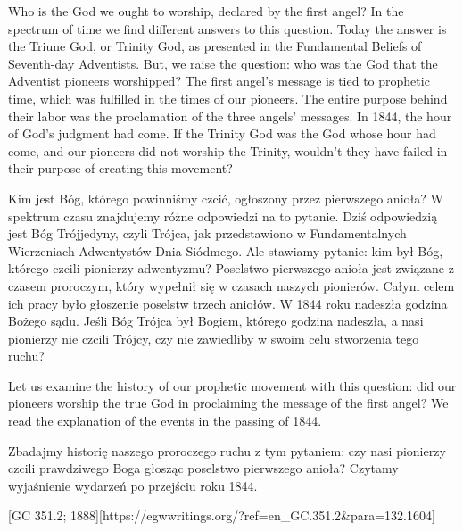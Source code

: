 Who is the God we ought to worship, declared by the first angel? In the spectrum of time we find different answers to this question. Today the answer is the Triune God, or Trinity God, as presented in the Fundamental Beliefs of Seventh-day Adventists. But, we raise the question: who was the God that the Adventist pioneers worshipped? The first angel’s message is tied to prophetic time, which was fulfilled in the times of our pioneers. The entire purpose behind their labor was the proclamation of the three angels’ messages. In 1844, the hour of God’s judgment had come. If the Trinity God was the God whose hour had come, and our pioneers did not worship the Trinity, wouldn't they have failed in their purpose of creating this movement?


Kim jest Bóg, którego powinniśmy czcić, ogłoszony przez pierwszego anioła? W spektrum czasu znajdujemy różne odpowiedzi na to pytanie. Dziś odpowiedzią jest Bóg Trójjedyny, czyli Trójca, jak przedstawiono w Fundamentalnych Wierzeniach Adwentystów Dnia Siódmego. Ale stawiamy pytanie: kim był Bóg, którego czcili pionierzy adwentyzmu? Poselstwo pierwszego anioła jest związane z czasem proroczym, który wypełnił się w czasach naszych pionierów. Całym celem ich pracy było głoszenie poselstw trzech aniołów. W 1844 roku nadeszła godzina Bożego sądu. Jeśli Bóg Trójca był Bogiem, którego godzina nadeszła, a nasi pionierzy nie czcili Trójcy, czy nie zawiedliby w swoim celu stworzenia tego ruchu?


Let us examine the history of our prophetic movement with this question: did our pioneers worship the true God in proclaiming the message of the first angel? We read the explanation of the events in the passing of 1844.


Zbadajmy historię naszego proroczego ruchu z tym pytaniem: czy nasi pionierzy czcili prawdziwego Boga głosząc poselstwo pierwszego anioła? Czytamy wyjaśnienie wydarzeń po przejściu roku 1844.


[GC 351.2; 1888][https://egwwritings.org/?ref=en\_GC.351.2&para=132.1604]


